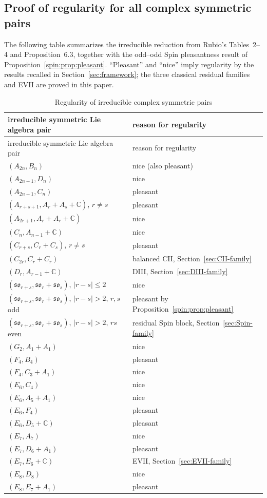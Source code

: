 \documentclass[10pt,a4paper]{amsart}
\numberwithin{equation}{section}
\newcommand{\C}{\mathbb C}
\begin{document}
\subsection{Proof of regularity for all complex symmetric pairs}

The following table summarizes the irreducible reduction from Rubio's
Tables~2--4 and Proposition~6.3, together with the odd--odd Spin pleasantness
result of Proposition~\ref{spin:prop:pleasant}.  ``Pleasant'' and ``nice''
imply regularity by the results recalled in Section~\ref{sec:framework}; the
three classical residual families and EVII are proved in this paper.

\begingroup
\small
\renewcommand{\arraystretch}{1.08}
\begin{longtable}{@{}p{}p{}@{}}
\caption{Regularity of irreducible complex symmetric pairs}
\label{tab:irreducible-reduction}\\
\toprule
irreducible symmetric Lie algebra pair & reason for regularity \\
\midrule
\endfirsthead
\toprule
irreducible symmetric Lie algebra pair & reason for regularity \\
\midrule
\endhead
$(A_{2n},B_n)$ & nice (also pleasant) \\
$(A_{2n-1},D_n)$ & nice \\
$(A_{2n-1},C_n)$ & pleasant \\
$(A_{r+s+1},A_r+A_s+\C)$, $r\ne s$ & pleasant \\
$(A_{2r+1},A_r+A_r+\C)$ & nice \\
$(C_n,A_{n-1}+\C)$ & nice \\
$(C_{r+s},C_r+C_s)$, $r\ne s$ & pleasant \\
$(C_{2r},C_r+C_r)$ & balanced CII, Section~\ref{sec:CII-family} \\
$(D_r,A_{r-1}+\C)$ & DIII, Section~\ref{sec:DIII-family} \\
$(\mathfrak{so}_{r+s},\mathfrak{so}_r+\mathfrak{so}_s)$,
$|r-s|\le2$ & nice \\
$(\mathfrak{so}_{r+s},\mathfrak{so}_r+\mathfrak{so}_s)$,
$|r-s|>2$, $r,s$ odd & pleasant by Proposition~\ref{spin:prop:pleasant} \\
$(\mathfrak{so}_{r+s},\mathfrak{so}_r+\mathfrak{so}_s)$,
$|r-s|>2$, $rs$ even & residual Spin block, Section~\ref{sec:Spin-family} \\
$(G_2,A_1+A_1)$ & nice \\
$(F_4,B_4)$ & pleasant \\
$(F_4,C_3+A_1)$ & nice \\
$(E_6,C_4)$ & nice \\
$(E_6,A_5+A_1)$ & nice \\
$(E_6,F_4)$ & pleasant \\
$(E_6,D_5+\C)$ & pleasant \\
$(E_7,A_7)$ & nice \\
$(E_7,D_6+A_1)$ & pleasant \\
$(E_7,E_6+\C)$ & EVII, Section~\ref{sec:EVII-family} \\
$(E_8,D_8)$ & nice \\
$(E_8,E_7+A_1)$ & pleasant \\
\bottomrule
\end{longtable}
\end{document}

